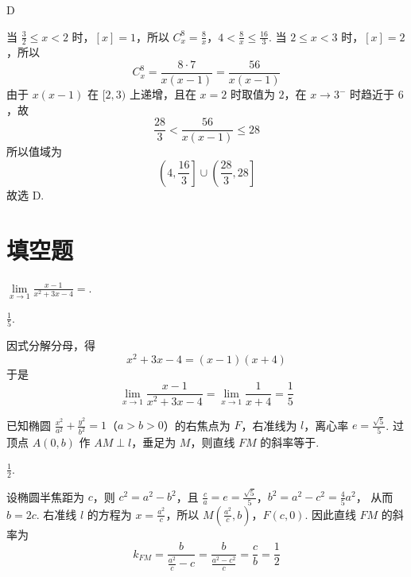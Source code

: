 \begin{answer}
D
\end{answer}

\begin{solution}
当 \(\frac32\leqslant x<2\) 时，\([x]=1\)，所以
\(C_x^8=\frac8x\)，\(4<\frac8x\leqslant\frac{16}{3}\).
当 \(2\leqslant x<3\) 时，\([x]=2\)，所以
\[
C_x^8=\frac{8\cdot7}{x(x-1)}=\frac{56}{x(x-1)}
\]
由于 \(x(x-1)\) 在 \([2,3)\) 上递增，且在 \(x=2\) 时取值为 \(2\)，在 \(x\to3^-\) 时趋近于 \(6\)，故
\[
\frac{28}{3}<\frac{56}{x(x-1)}\leqslant28
\]
所以值域为
\[
\left(4,\frac{16}{3}\right]\cup\left(\frac{28}{3},28\right]
\]
故选 D.
\end{solution}

\section{填空题}

\begin{problem}
\(\lim\limits_{x \to 1} \frac{x - 1}{x^{2} + 3x - 4} =\)\fillinblank{}.
\end{problem}

\begin{answer}
\(\frac{1}{5}\).
\end{answer}

\begin{solution}
因式分解分母，得
\[
x^2+3x-4=(x-1)(x+4)
\]
于是
\[
\lim_{x\to1}\frac{x-1}{x^2+3x-4}
=\lim_{x\to1}\frac{1}{x+4}=\frac15
\]
\end{solution}

\begin{problem}
已知椭圆 \(\frac{x^2}{a^2} + \frac{y^2}{b^2} = 1\)（\(a > b > 0\)）的右焦点为 \(F\)，右准线为 \(l\)，离心率 \(e = \frac{\sqrt{5}}{5}\). 过顶点 \(A(0, b)\) 作 \(AM \perp l\)，垂足为 \(M\)，则直线 \(FM\) 的斜率等于\fillinblank{}.
\end{problem}

\begin{answer}
\(\frac{1}{2}\).
\end{answer}

\begin{solution}
设椭圆半焦距为 \(c\)，则 \(c^2=a^2-b^2\)，且
\(\frac ca=e=\frac{\sqrt5}{5}\)，\(b^2=a^2-c^2=\frac45a^2\)，
从而 \(b=2c\). 右准线 \(l\) 的方程为 \(x=\frac{a^2}{c}\)，所以
\(M\left(\frac{a^2}{c},b\right)\)，\(F(c,0)\).
因此直线 \(FM\) 的斜率为
\[
k_{FM}=\frac{b}{\frac{a^2}{c}-c}
=\frac{b}{\frac{a^2-c^2}{c}}
=\frac{c}{b}=\frac12
\]
\end{solution}

